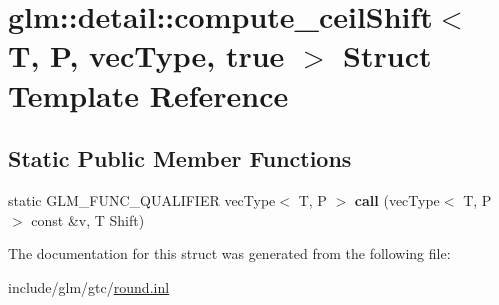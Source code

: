\hypertarget{structglm_1_1detail_1_1compute__ceilShift_3_01T_00_01P_00_01vecType_00_01true_01_4}{}\section{glm\+:\+:detail\+:\+:compute\+\_\+ceil\+Shift$<$ T, P, vec\+Type, true $>$ Struct Template Reference}
\label{structglm_1_1detail_1_1compute__ceilShift_3_01T_00_01P_00_01vecType_00_01true_01_4}
\subsection*{Static Public Member Functions}
\begin{DoxyCompactItemize}
\item 
\mbox{\label{structglm_1_1detail_1_1compute__ceilShift_3_01T_00_01P_00_01vecType_00_01true_01_4_ae120f08254abe3447d5f3310138fc6a3}} 
static G\+L\+M\+\_\+\+F\+U\+N\+C\+\_\+\+Q\+U\+A\+L\+I\+F\+I\+ER vec\+Type$<$ T, P $>$ {\bfseries call} (vec\+Type$<$ T, P $>$ const \&v, T Shift)
\end{DoxyCompactItemize}


The documentation for this struct was generated from the following file\+:\begin{DoxyCompactItemize}
\item 
include/glm/gtc/\hyperlink{round_8inl}{round.\+inl}\end{DoxyCompactItemize}
